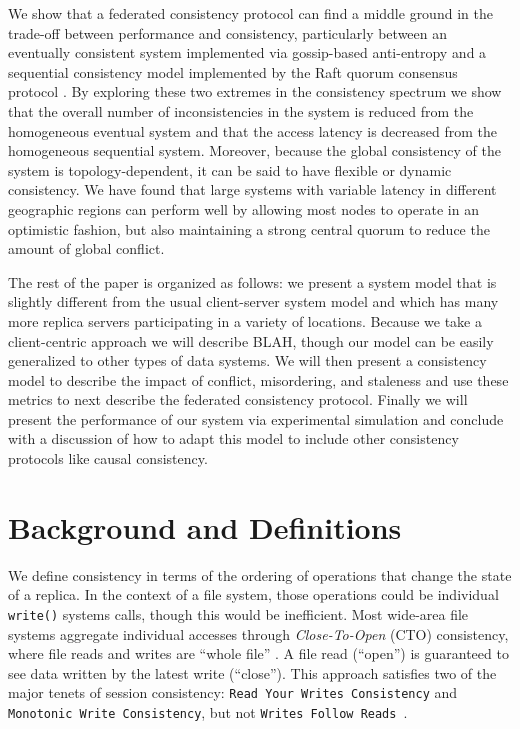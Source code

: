 \documentclass[10pt,conference,letterpaper]{IEEEtran}
\begin{document}
We show that a federated consistency protocol can find a middle ground in the trade-off
between performance and consistency, particularly between an eventually consistent system
implemented via gossip-based anti-entropy \cite{kempe_gossip-based_2003} and a sequential
consistency model implemented by the Raft quorum consensus protocol \cite{ongaro_search_2014}.
By exploring these two extremes in the consistency spectrum we show that the overall
number of inconsistencies in the system is reduced from the homogeneous eventual system and
that the access latency is decreased from the homogeneous sequential system.
Moreover, because the global consistency of the system is topology-dependent, it can be
said to have flexible or dynamic consistency.
We have found that large systems with variable latency in different geographic regions can
perform well by allowing most nodes to operate in an optimistic fashion, but also maintaining a
strong central quorum to reduce the amount of global conflict.

The rest of the paper is organized as follows: we present a system model that is slightly
different from the usual client-server system model and which has many more replica
servers participating in a variety of locations.
Because we take a client-centric approach we will describe BLAH,
though our model can be easily generalized to other types of data systems.
We will then present a consistency model to describe the impact of conflict, misordering,
and staleness and use these metrics to next describe the federated consistency protocol.
Finally we will present the performance of our system via experimental simulation and
conclude with a discussion of how to adapt this model to include other consistency
protocols like causal consistency.

\section{Background and Definitions}
\label{sec:background}

We define consistency in terms of the ordering of operations that change the state of a
replica.
In the context of a file system, those operations could be individual \texttt{write()}
systems calls, though this would be inefficient.
Most wide-area file systems aggregate individual accesses through \textit{Close-To-Open}
(CTO) consistency, where file reads and writes are ``whole file''
\cite{afs,coda,muthitacharoen_low-bandwidth_2001}.
A file read (``open'') is guaranteed to see data written by the latest write (``close'').
This approach satisfies two of the major tenets of session consistency: \texttt{Read Your
Writes Consistency} and \texttt{Monotonic Write Consistency}, but not \texttt{Writes
Follow Reads}~\cite{bermbach_consistency_2013,terry_session_1994,vogels_eventually_2009}.
\end{document}
